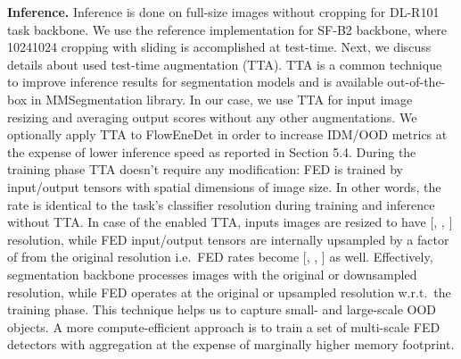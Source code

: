 \documentclass[accepted, startpage]{uai2023}
\newcommand{\ie}{i.e.}
\newcommand{\wrt}{w.r.t.}
\begin{document}
\textbf{Inference.} Inference is done on full-size images without cropping for DL-R101 task backbone. We use the reference implementation for SF-B2 backbone, where 10241024 cropping with sliding is accomplished at test-time. Next, we discuss details about used test-time augmentation (TTA). TTA is a common technique to improve inference results for segmentation models and is available out-of-the-box in MMSegmentation library. In our case, we use TTA for input image resizing and averaging output scores without any other augmentations. We optionally apply TTA to FlowEneDet in order to increase IDM/OOD metrics at the expense of lower inference speed as reported in Section 5.4. During the training phase TTA doesn't require any modification: FED is trained by input/output tensors with  spatial dimensions of image size. In other words, the  rate is identical to the task's classifier resolution during training and inference without TTA. In case of the enabled TTA, inputs images are resized to have [, , ] resolution, while FED input/output tensors are internally upsampled by a factor of  from the original  resolution \ie~FED rates become [, , ] as well. Effectively, segmentation backbone processes images with the original or downsampled resolution, while FED operates at the original or upsampled resolution \wrt~the training phase. This technique helps us to capture small- and large-scale OOD objects. A more compute-efficient approach is to train a set of multi-scale FED detectors with aggregation at the expense of marginally higher memory footprint.
\end{document}
